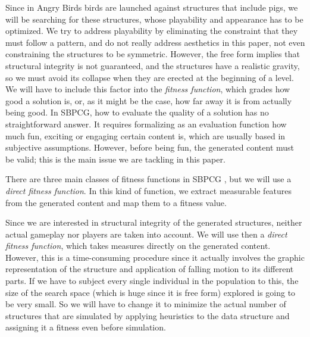\documentclass[sigconf]{acmart}
\begin{document}
Since in Angry Birds birds are
launched against structures that include pigs, we will be searching
for these structures, whose playability and appearance has to be
optimized. We try to address playability by eliminating the constraint
that they must follow a pattern, and do not really address aesthetics
in this paper, not even constraining the structures to be
symmetric. However, the free form implies that structural integrity is
not guaranteed, and the structures have a realistic
gravity, so we must avoid its collapse when they are erected at the
beginning of a level. We will have to include this factor into the 
\textit{fitness function}, which grades how good a solution is, or, as
it might be the case, how far away it is from actually being good.
In SBPCG, how to evaluate the quality of a solution has no straightforward 
answer. It requires formalizing as an evaluation function how much fun, 
exciting or engaging certain content is, which are usually based in subjective 
assumptions. However, before being fun, the generated content must be
valid; this is the main issue we are tackling in this paper.

There are three main classes of fitness functions in 
SBPCG \cite{togelius2010search}, but we will use a {\em direct fitness function}.
In this kind of function, we extract measurable features from the generated content and map them to a fitness value.


Since we are interested in structural integrity of the generated
structures, neither actual gameplay nor players are taken into
account. We will use then a {\em direct fitness function}, which takes
measures directly on the generated content. However, this is a
time-consuming procedure since it actually involves the graphic
representation of the structure and application of falling motion to
its different parts. If we have to subject every single individual in
the population to this, the size of the search space (which is huge
since it is free form) explored is going to be very small. So we will
have to change it to minimize the actual number of structures that are
simulated by applying heuristics to the data structure and assigning
it a fitness even before simulation.
\end{document}
